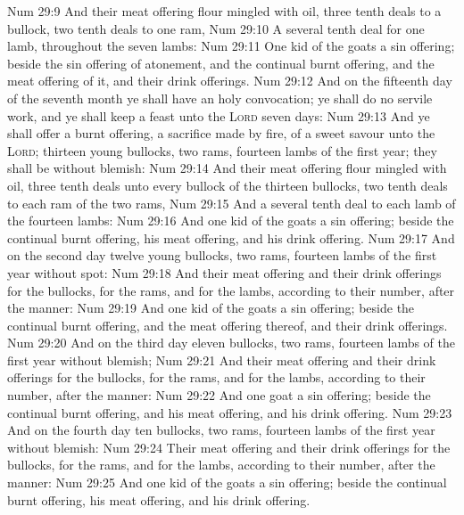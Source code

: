 \vs Num 29:9 And their meat offering  flour mingled with oil, three tenth deals to a bullock,  two tenth deals to one ram,
\vs Num 29:10 A several tenth deal for one lamb, throughout the seven lambs:
\vs Num 29:11 One kid of the goats  a sin offering; beside the sin offering of atonement, and the continual burnt offering, and the meat offering of it, and their drink offerings.
\vs Num 29:12 And on the fifteenth day of the seventh month ye shall have an holy convocation; ye shall do no servile work, and ye shall keep a feast unto the \textsc{Lord} seven days:
\vs Num 29:13 And ye shall offer a burnt offering, a sacrifice made by fire, of a sweet savour unto the \textsc{Lord}; thirteen young bullocks, two rams,  fourteen lambs of the first year; they shall be without blemish:
\vs Num 29:14 And their meat offering  flour mingled with oil, three tenth deals unto every bullock of the thirteen bullocks, two tenth deals to each ram of the two rams,
\vs Num 29:15 And a several tenth deal to each lamb of the fourteen lambs:
\vs Num 29:16 And one kid of the goats  a sin offering; beside the continual burnt offering, his meat offering, and his drink offering.
\vs Num 29:17 And on the second day  twelve young bullocks, two rams, fourteen lambs of the first year without spot:
\vs Num 29:18 And their meat offering and their drink offerings for the bullocks, for the rams, and for the lambs,  according to their number, after the manner:
\vs Num 29:19 And one kid of the goats  a sin offering; beside the continual burnt offering, and the meat offering thereof, and their drink offerings.
\vs Num 29:20 And on the third day eleven bullocks, two rams, fourteen lambs of the first year without blemish;
\vs Num 29:21 And their meat offering and their drink offerings for the bullocks, for the rams, and for the lambs,  according to their number, after the manner:
\vs Num 29:22 And one goat  a sin offering; beside the continual burnt offering, and his meat offering, and his drink offering.
\vs Num 29:23 And on the fourth day ten bullocks, two rams,  fourteen lambs of the first year without blemish:
\vs Num 29:24 Their meat offering and their drink offerings for the bullocks, for the rams, and for the lambs,  according to their number, after the manner:
\vs Num 29:25 And one kid of the goats  a sin offering; beside the continual burnt offering, his meat offering, and his drink offering.

